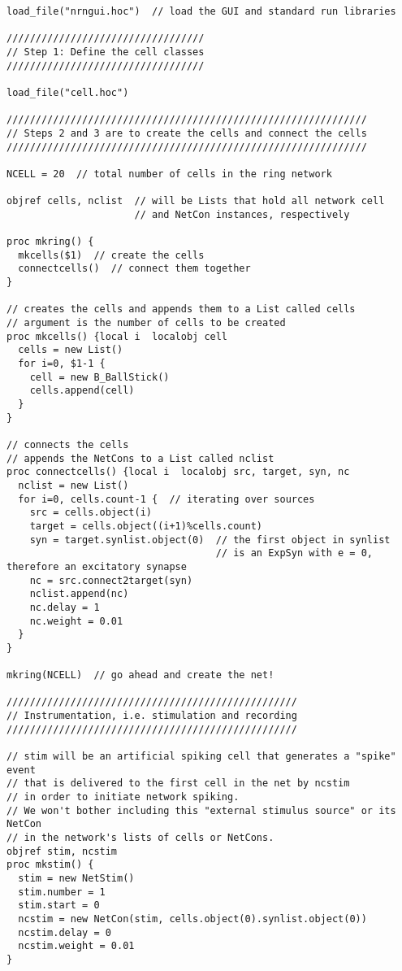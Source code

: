 \documentclass[10pt]{article}
\begin{document}
\linenumbers
\begin{verbatim}
load_file("nrngui.hoc")  // load the GUI and standard run libraries

//////////////////////////////////
// Step 1: Define the cell classes
//////////////////////////////////

load_file("cell.hoc")

//////////////////////////////////////////////////////////////
// Steps 2 and 3 are to create the cells and connect the cells
//////////////////////////////////////////////////////////////

NCELL = 20  // total number of cells in the ring network

objref cells, nclist  // will be Lists that hold all network cell
                      // and NetCon instances, respectively

proc mkring() {
  mkcells($1)  // create the cells
  connectcells()  // connect them together
}

// creates the cells and appends them to a List called cells
// argument is the number of cells to be created
proc mkcells() {local i  localobj cell
  cells = new List()
  for i=0, $1-1 {
    cell = new B_BallStick()
    cells.append(cell)
  }
}

// connects the cells
// appends the NetCons to a List called nclist
proc connectcells() {local i  localobj src, target, syn, nc
  nclist = new List()
  for i=0, cells.count-1 {  // iterating over sources
    src = cells.object(i)
    target = cells.object((i+1)%cells.count)
    syn = target.synlist.object(0)  // the first object in synlist
                                    // is an ExpSyn with e = 0, therefore an excitatory synapse
    nc = src.connect2target(syn)
    nclist.append(nc)
    nc.delay = 1
    nc.weight = 0.01
  }
}

mkring(NCELL)  // go ahead and create the net!

//////////////////////////////////////////////////
// Instrumentation, i.e. stimulation and recording
//////////////////////////////////////////////////

// stim will be an artificial spiking cell that generates a "spike" event
// that is delivered to the first cell in the net by ncstim
// in order to initiate network spiking.
// We won't bother including this "external stimulus source" or its NetCon
// in the network's lists of cells or NetCons.
objref stim, ncstim
proc mkstim() {
  stim = new NetStim()
  stim.number = 1
  stim.start = 0
  ncstim = new NetCon(stim, cells.object(0).synlist.object(0))
  ncstim.delay = 0
  ncstim.weight = 0.01
}


\end{verbatim}
\end{document}
